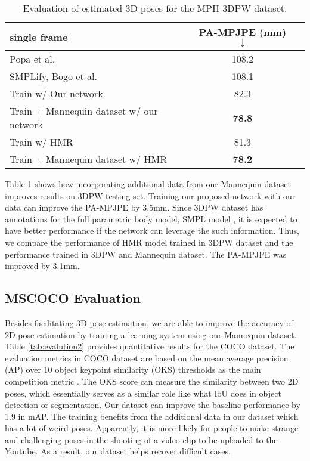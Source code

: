 \documentclass{article}
\begin{document}
\begin{table}[h]
\centering
\begin{tabular}{l|cc}\hline\hline
single frame & PA-MPJPE (mm) $\downarrow$  \\ \hline
Popa et al. \cite{popa2017deep} & 108.2 \\
SMPLify, Bogo et al. \cite{bogo2016keep} & 108.1 \\
Train w/ Our network & 82.3 \\
Train + Mannequin dataset w/ our network & \textbf{78.8} \\ \hline
Train w/ HMR \cite{kanazawa2018end} & 81.3  \\
Train + Mannequin dataset w/ HMR \cite{kanazawa2018end} & \textbf{78.2} \\ \hline \hline
\end{tabular}
\caption{Evaluation of estimated 3D poses for the MPII-3DPW dataset.}\label{tab:3dpw}
\end{table}


Table \ref{tab:3dpw} shows how incorporating additional data from our
Mannequin dataset improves results on 3DPW testing set.  Training our
proposed network with our data can improve the PA-MPJPE by 3.5mm. Since
3DPW dataset has annotations for the full parametric body model, SMPL
model \cite{loper2015smpl}, it is expected to have better performance if
the network can leverage the such information. Thus, we compare the
performance of HMR model trained in 3DPW dataset and the performance
trained in 3DPW and Mannequin dataset. The PA-MPJPE was improved by 3.1mm.

\subsection{MSCOCO Evaluation}

Besides facilitating 3D pose estimation, we are able to improve the
accuracy of 2D pose estimation by training a learning system using our
Mannequin dataset.  Table \ref{tab:evalution2} provides quantitative
results for the COCO dataset. The evaluation metrics in COCO dataset  are based on the mean average precision (AP) over 10 object keypoint similarity (OKS) thresholds as the main competition metric \cite{lin2014microsoft}. The OKS score can measure the similarity between two 2D poses, which essentially serves as a similar role like what IoU does in object
detection or segmentation. Our dataset can improve the baseline
performance by 1.9 in mAP. The training benefits from the additional data in our dataset which has a lot of weird poses.  Apparently, it is more likely for people to make strange and
challenging poses in the shooting of a video clip to be uploaded to the
Youtube. As a result, our dataset helps recover difficult cases. 
\end{document}
